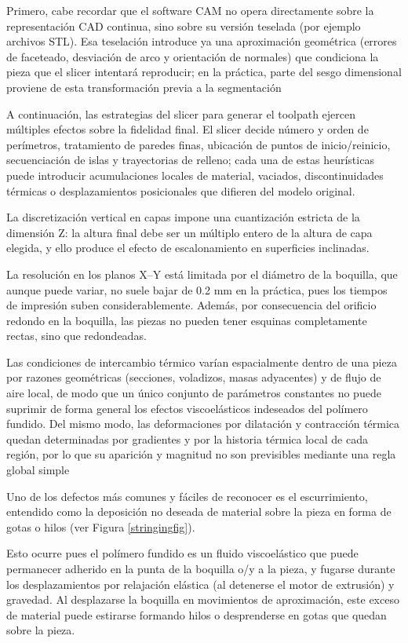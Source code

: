 Primero, cabe recordar que el software CAM no opera directamente sobre la representación CAD continua, sino sobre su versión teselada (por ejemplo archivos STL). Esa teselación introduce ya una aproximación geométrica (errores de faceteado, desviación de arco y orientación de normales) que condiciona la pieza que el slicer intentará reproducir; en la práctica, parte del sesgo dimensional proviene de esta transformación previa a la segmentación

A continuación, las estrategias del slicer para generar el toolpath ejercen múltiples efectos sobre la fidelidad final. El slicer decide número y orden de perímetros, tratamiento de paredes finas, ubicación de puntos de inicio/reinicio, secuenciación de islas y trayectorias de relleno; cada una de estas heurísticas puede introducir acumulaciones locales de material, vaciados, discontinuidades térmicas o desplazamientos posicionales que difieren del modelo original.

La discretización vertical en capas impone una cuantización estricta de la dimensión Z: la altura final debe ser un múltiplo entero de la altura de capa elegida, y ello produce el efecto de escalonamiento en superficies inclinadas. 

La resolución en los planos X–Y está limitada por el diámetro de la boquilla, que aunque puede variar, no suele bajar de 0.2 mm en la práctica, pues los tiempos de impresión suben considerablemente. Además, por consecuencia del orificio redondo en la boquilla, las piezas no pueden tener esquinas completamente rectas, sino que redondeadas.

Las condiciones de intercambio térmico varían espacialmente dentro de una pieza por razones geométricas (secciones, voladizos, masas adyacentes) y de flujo de aire local, de modo que un único conjunto de parámetros constantes no puede suprimir de forma general los efectos viscoelásticos indeseados del polímero fundido. Del mismo modo, las deformaciones por dilatación y contracción térmica quedan determinadas por gradientes y por la historia térmica local de cada región, por lo que su aparición y magnitud no son previsibles mediante una regla global simple

Uno de los defectos más comunes y fáciles de reconocer es el escurrimiento, entendido como la deposición no deseada de material sobre la pieza en forma de gotas o hilos (ver Figura \ref{stringingfig}).

Esto ocurre pues el polímero fundido es un fluido viscoelástico que puede permanecer adherido en la punta de la boquilla o/y a la pieza, y fugarse durante los desplazamientos por relajación elástica (al detenerse el motor de extrusión) y gravedad. Al desplazarse la boquilla en movimientos de aproximación, este exceso de material puede estirarse formando hilos o desprenderse en gotas que quedan sobre la pieza.

